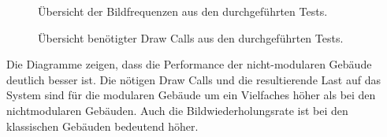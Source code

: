 \begin{figure}[H]
\centering
  \caption{Übersicht der Bildfrequenzen aus den durchgeführten Tests.}
	\label{PerformancteTestFPS}
\end{figure}
\begin{figure}[H]
\centering
  \caption{Übersicht benötigter Draw Calls  aus den durchgeführten Tests.}
	\label{PerformancteTestDC}
\end{figure}
Die Diagramme zeigen, dass die Performance der nicht-modularen Gebäude deutlich besser ist. Die nötigen Draw Calls und die resultierende Last auf das System sind für die modularen Gebäude um ein Vielfaches höher als bei den nichtmodularen Gebäuden. Auch die Bildwiederholungsrate ist bei den klassischen Gebäuden bedeutend höher.
